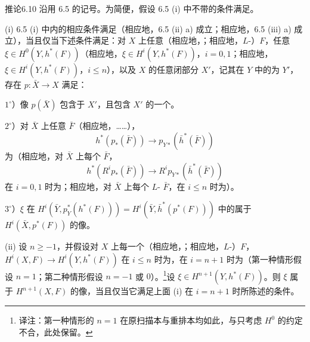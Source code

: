 \begin{SGAresult}{推论}{6.10}
沿用 6.5 的记号。为简便，假设 6.5 (i) 中不带的条件满足。

(i) 6.5 (i) 中内的相应条件满足（相应地，6.5 (ii) a) 成立；相应地，6.5 (iii) a) 成立），当且仅当下述条件满足：对 $X$ 上任意（相应地，；相应地，$L$-）$F$，任意 $\xi\in H^0(Y,h^*(F))$（相应地，$\xi\in H^i(Y,h^*(F))$，$i=0,1$；相应地，$\xi\in H^i(Y,h^*(F))$，$i\leq n$），以及 $X$ 的任意闭部分 $X'$，记其在 $Y$ 中的为 $Y'$，存在 $p:\bar X\to X$ 满足：

 $1^\circ$）像 $p(\bar X)$ 包含于 $X'$，且包含 $X'$ 的一个。

 $2^\circ$）对 $\bar X$ 上任意 $\bar F$（相应地，……），
\[
h^*(p_*(\bar F))\longrightarrow p_{Y*}(\bar h^*(\bar F))
\]
为（相应地，对 $\bar X$ 上每个 $\bar F$，
\[
h^*(R^ip_*(\bar F))\longrightarrow R^ip_{Y*}(\bar h^*(\bar F))
\]
在 $i=0,1$ 时为；相应地，对 $\bar X$ 上每个 $L$- $\bar F$，在 $i\leq n$ 时为）。

 $3^\circ$）$\xi$ 在 $H^i(\bar Y,p_Y^*(h^*(F)))=H^i(\bar Y,\bar h^*(p^*(F)))$ 中的属于 $H^i(\bar X,p^*(F))$ 的像。

(ii) 设 $n\geq-1$，并假设对 $X$ 上每一个（相应地，；相应地，$L$-）$F$， $H^i(X,F)\to H^i(Y,h^*(F))$ 在 $i\leq n$ 时为，在 $i=n+1$ 时为（第一种情形假设 $n=1$；第二种情形假设 $n=-1$ 或 $0$）。\footnote{译注：第一种情形的 $n=1$ 在原扫描本与重排本均如此，与只考虑 $H^0$ 的约定不合，此处保留。}设 $\xi\in H^{n+1}(Y,h^*(F))$。则 $\xi$ 属于 $H^{n+1}(X,F)$ 的像，当且仅当它满足上面 (i) 在 $i=n+1$ 时所陈述的条件。
\end{SGAresult}

